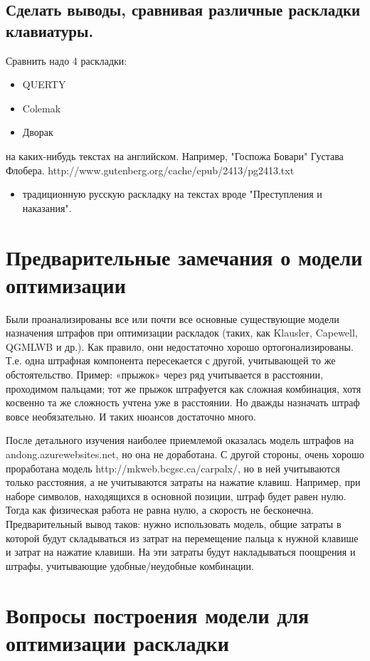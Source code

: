 \documentclass[14pt]{article} %
\begin{document}
\subsection {Сделать выводы, сравнивая различные раскладки клавиатуры.}
Сравнить надо 4 раскладки:
\begin{itemize}
\item QUERTY
\item Colemak
\item Дворак
\end{itemize}
на каких-нибудь текстах на английском. Например, "Госпожа Бовари" Густава Флобера.
http://www.gutenberg.org/cache/epub/2413/pg2413.txt
\begin{itemize}
\item традиционную русскую раскладку на текстах вроде "Преступления и наказания".
\end{itemize}
\section{Предварительные замечания о модели оптимизации}


Были проанализированы все или почти все основные существующие модели назначения штрафов при оптимизации раскладок (таких, как Klausler, Capewell, QGMLWB и др.). Как правило, они недостаточно хорошо ортогонализированы. Т.е. одна штрафная компонента пересекается с другой, учитывающей то же обстоятельство. Пример: «прыжок» через ряд учитывается в расстоянии, проходимом пальцами; тот же прыжок штрафуется как сложная комбинация, хотя косвенно та же сложность учтена уже в расстоянии. Но дважды назначать штраф вовсе необязательно. И таких нюансов достаточно много.

После детального изучения наиболее приемлемой оказалась модель штрафов на \\
andong.azurewebsites.net, но она не доработана. С другой стороны, очень хорошо проработана модель http://mkweb.bcgsc.ca/carpalx/, но в ней учитываются только расстояния, а не учитываются затраты на нажатие клавиш. Например, при наборе символов, находящихся в основной позиции, штраф будет равен нулю. Тогда как физическая работа не равна нулю, а скорость не бесконечна. Предварительный вывод таков: нужно использовать модель, общие затраты в которой будут складываться из затрат на перемещение пальца к нужной клавише и затрат на нажатие клавиши. На эти затраты будут накладываться поощрения и штрафы, учитывающие удобные/неудобные комбинации.

\section {Вопросы построения модели для оптимизации раскладки}
\end{document}
